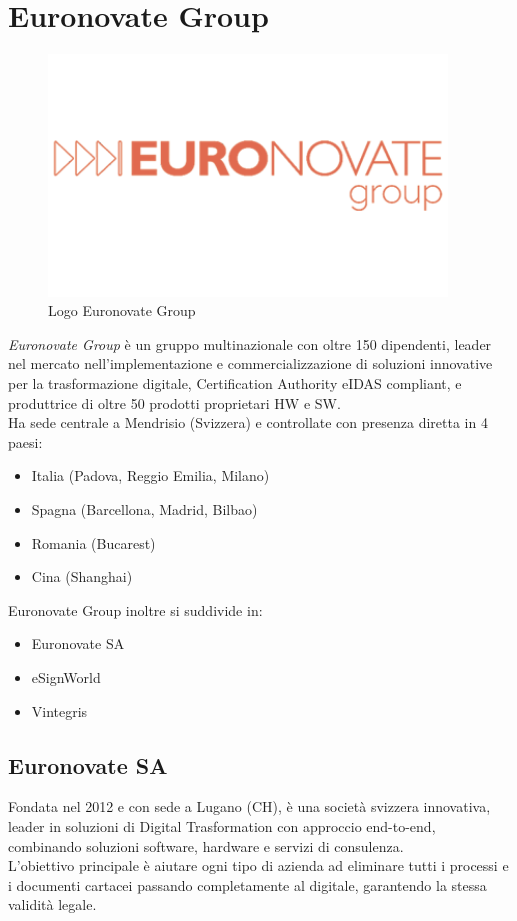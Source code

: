 \section{Euronovate Group}
\begin{figure}[!h] 
    \centering 
    \includegraphics[width=300pt]{images/euronovateGroupLogo.png} 
    \caption{Logo Euronovate Group}
\end{figure}
\emph{Euronovate Group} è un gruppo multinazionale con oltre 150 dipendenti, leader nel mercato
nell'implementazione e commercializzazione di soluzioni innovative per la trasformazione digitale,
Certification Authority eIDAS compliant, e produttrice di oltre 50 prodotti proprietari HW e
SW.\\
Ha sede centrale a Mendrisio (Svizzera) e controllate con presenza diretta in 4 paesi:
\begin{itemize}
    \item Italia (Padova, Reggio Emilia, Milano)
    \item Spagna (Barcellona, Madrid, Bilbao)
    \item Romania (Bucarest)
    \item Cina (Shanghai)
\end{itemize}
Euronovate Group inoltre si suddivide in:
\begin{itemize}
    \item Euronovate SA
    \item eSignWorld
    \item Vintegris
\end{itemize}

\subsection{Euronovate SA}
Fondata nel 2012 e con sede a Lugano (CH), è una società svizzera innovativa, leader in soluzioni
di Digital Trasformation con approccio end-to-end, combinando soluzioni software, hardware
e servizi di consulenza.\\
L'obiettivo principale è aiutare ogni tipo di azienda ad eliminare tutti i processi e i documenti
cartacei passando completamente al digitale, garantendo la stessa validità legale.

